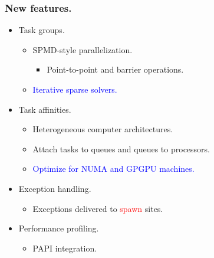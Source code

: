 \documentclass{beamer}
\begin{document}
\begin{frame}
\frametitle{New features.}
\begin{itemize}
\item Task groups.
  \begin{itemize}
  \item SPMD-style parallelization.
    \begin{itemize}
    \item Point-to-point and barrier operations.
    \end{itemize}
  \item \textcolor{blue}{Iterative sparse solvers.}
  \end{itemize}
\item Task affinities.
  \begin{itemize}
  \item Heterogeneous computer architectures.
  \item Attach tasks to queues and queues to processors.
  \item \textcolor{blue}{Optimize for NUMA and GPGPU machines.}
  \end{itemize}
\item Exception handling.
  \begin{itemize}
  \item Exceptions delivered to \textcolor{red}{spawn} sites.
  \end{itemize}
\item Performance profiling.
  \begin{itemize}
  \item PAPI integration.
  \end{itemize}
\end{itemize}
\end{frame}
\end{document}
